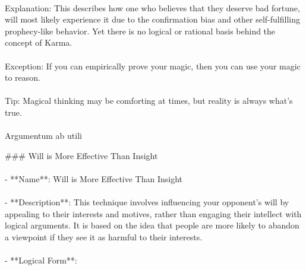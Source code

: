 \documentclass[a4paper,12pt,single,pdftex]{scrbook}
\begin{document}
    
      
    \\

    
      Explanation: This describes how one who believes that they deserve bad fortune, will most likely experience it due to the confirmation bias and other self-fulfilling prophecy-like behavior.  Yet there is no logical or rational basis behind the concept of Karma.
    \\

    
      
    \\

    
      Exception: If you can empirically prove your magic, then you can use your magic to reason.
    \\

    
      
    \\

    
      Tip: Magical thinking may be comforting at times, but reality is always what’s true.
    \\

    
      
    \\

  

Argumentum ab utili
    
      \#\#\# Will is More Effective Than Insight
    \\

    
      
    \\

    
      - **Name**: Will is More Effective Than Insight
    \\

    
      
    \\

    
      - **Description**: This technique involves influencing your opponent's will by appealing to their interests and motives, rather than engaging their intellect with logical arguments. It is based on the idea that people are more likely to abandon a viewpoint if they see it as harmful to their interests.
    \\

    
      
    \\

    
      - **Logical Form**:
    \\
\end{document}
